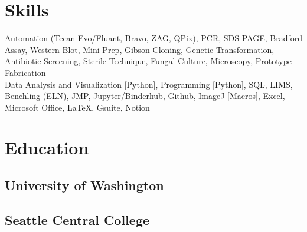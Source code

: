 \documentclass[]{forrest-resume-interfont}
\begin{document}
\linesep

\section{ Skills}
Automation (Tecan Evo/Fluant, Bravo, ZAG, QPix),
PCR, 
SDS-PAGE,
Bradford Assay,
Western Blot,
Mini Prep, 
Gibson Cloning,
Genetic Transformation,
Antibiotic Screening,
Sterile Technique, 
Fungal Culture, 
Microscopy, 
Prototype Fabrication
\\

Data Analysis and Visualization [Python],
Programming [Python],
SQL,
LIMS,
Benchling (ELN),
JMP,
Jupyter/Binderhub,
Github,
ImageJ [Macros],
Excel,
Microsoft Office,
LaTeX,
Gsuite,
Notion

\linesep


\section{ Education}
\subsection{University of Washington}
\spacesep
\subsection{Seattle Central College}

\vfill

\noindent\makebox[\linewidth]{\color{black}\rule{\paperwidth}{0.4pt}}
\end{document}

